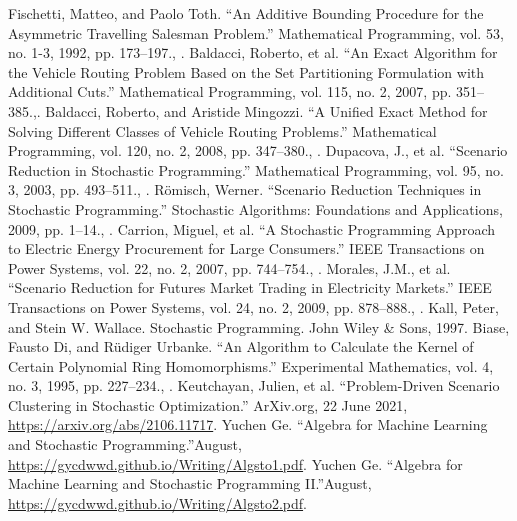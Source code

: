 \documentclass{article}
\theoremstyle{plain}
\theoremstyle{definition}
\begin{document}
\begin{thebibliography}{99}
Fischetti, Matteo, and Paolo Toth. “An Additive Bounding Procedure for the Asymmetric Travelling Salesman Problem.” Mathematical Programming, vol. 53, no. 1-3, 1992, pp. 173–197., . 
Baldacci, Roberto, et al. “An Exact Algorithm for the Vehicle Routing Problem Based on the Set Partitioning Formulation with Additional Cuts.” Mathematical Programming, vol. 115, no. 2, 2007, pp. 351–385.,. 
Baldacci, Roberto, and Aristide Mingozzi. “A Unified Exact Method for Solving Different Classes of Vehicle Routing Problems.” Mathematical Programming, vol. 120, no. 2, 2008, pp. 347–380., . 
Dupacova, J., et al. “Scenario Reduction in Stochastic Programming.” Mathematical Programming, vol. 95, no. 3, 2003, pp. 493–511., . 
Römisch, Werner. “Scenario Reduction Techniques in Stochastic Programming.” Stochastic Algorithms: Foundations and Applications, 2009, pp. 1–14., . 
Carrion, Miguel, et al. “A Stochastic Programming Approach to Electric Energy Procurement for Large Consumers.” IEEE Transactions on Power Systems, vol. 22, no. 2, 2007, pp. 744–754., . 
Morales, J.M., et al. “Scenario Reduction for Futures Market Trading in Electricity Markets.” IEEE Transactions on Power Systems, vol. 24, no. 2, 2009, pp. 878–888., . 
 Kall, Peter, and Stein W. Wallace. Stochastic Programming. John Wiley & Sons, 1997. 
Biase, Fausto Di, and Rüdiger Urbanke. “An Algorithm to Calculate the Kernel of Certain Polynomial Ring Homomorphisms.” Experimental Mathematics, vol. 4, no. 3, 1995, pp. 227–234., .
Keutchayan, Julien, et al. “Problem-Driven Scenario Clustering in Stochastic Optimization.” ArXiv.org, 22 June 2021, \href{https://arxiv.org/abs/2106.11717}{https://arxiv.org/abs/2106.11717}.  
Yuchen Ge. “Algebra for Machine Learning and Stochastic Programming.”August, \href{https://gycdwwd.github.io/Writing/Algsto1.pdf}{https://gycdwwd.github.io/Writing/Algsto1.pdf}.  
Yuchen Ge. “Algebra for Machine Learning and Stochastic Programming II.”August, \href{https://gycdwwd.github.io/Writing/Algsto2.pdf}{https://gycdwwd.github.io/Writing/Algsto2.pdf}.  

\end{thebibliography}
\end{document}
